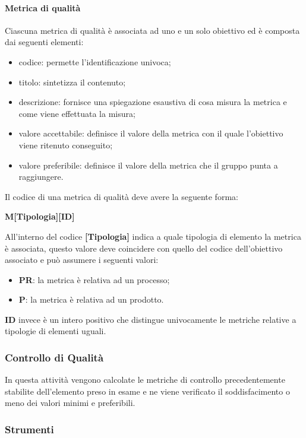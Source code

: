 \paragraph{Metrica di qualità}
\label{par:metrica_qualita}

Ciascuna metrica di qualità è associata ad uno e un solo obiettivo ed è composta dai seguenti elementi:
\begin{itemize}
	\item codice: permette l'identificazione univoca;
	\item titolo: sintetizza il contenuto;
	\item descrizione: fornisce una spiegazione esaustiva di cosa misura la metrica e come viene effettuata la misura;
	\item valore accettabile: definisce il valore della metrica con il quale l'obiettivo viene ritenuto conseguito;
	\item valore preferibile: definisce il valore della metrica che il gruppo punta a raggiungere.
\end{itemize}

Il codice di una metrica di qualità deve avere la seguente forma:
\begin{center}
    \textbf{M[Tipologia][ID]}
\end{center}
All'interno del codice \textbf{[Tipologia]} indica a quale tipologia di elemento la metrica è associata, questo valore deve coincidere con
quello del codice dell'obiettivo associato e può assumere i seguenti valori:
\begin{itemize}
	\item \textbf{PR}: la metrica è relativa ad un processo;
	\item \textbf{P}: la metrica è relativa ad un prodotto.
\end{itemize}
\textbf{ID} invece è un intero positivo che distingue univocamente le metriche relative a tipologie di elementi uguali.

\subsubsection{Controllo di Qualità}
\label{ssub:controllo_qualita}

In questa attività vengono calcolate le metriche di controllo precedentemente stabilite dell'elemento preso in esame e ne viene verificato
il soddisfacimento o meno dei valori minimi e preferibili.

\subsubsection{Strumenti}
\label{ssub:gestione_qualita:strumenti}

